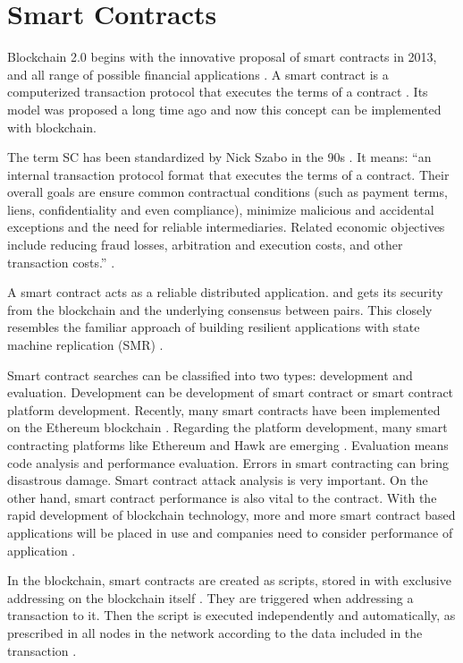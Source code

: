 \section{Smart Contracts}\label{sec:smartContracts}

Blockchain 2.0 begins with the innovative proposal of smart contracts in 2013, and all range of possible financial applications \cite{greve2018blockchain}. A smart contract is a computerized transaction protocol that executes the terms of a contract \cite{szabo1997idea}. Its model was proposed a long time ago and now this concept can be implemented with blockchain.

The term \acf{SC} has been standardized by Nick Szabo in the 90s \cite{greve2018blockchain}. It means: “an internal transaction protocol format that executes the terms of a contract. Their overall goals are ensure common contractual conditions (such as payment terms, liens, confidentiality and even compliance), minimize malicious and accidental exceptions and the need for reliable intermediaries. Related economic objectives include reducing fraud losses, arbitration and execution costs, and other transaction costs.” \cite{szabo1997idea}.

A smart contract acts as a reliable distributed application. and gets its security from the blockchain and the underlying consensus between pairs. This closely resembles the familiar approach of building resilient applications with state machine replication (SMR) \cite{schneider1990implementing}.

Smart contract searches can be classified into two types: development and evaluation. Development can be development of smart contract or smart contract platform development. Recently, many smart contracts have been implemented on the Ethereum blockchain \cite{wood2018secure}. Regarding the platform development, many smart contracting platforms like Ethereum \cite{wood2018secure} and Hawk \cite{kosbaa2016theblockchain} are emerging \cite{zheng2016blockchain}. Evaluation means code analysis and performance evaluation. Errors in smart contracting can bring disastrous damage. Smart contract attack analysis is very important. On the other hand, smart contract performance is also vital to the contract. With the rapid development of blockchain technology, more and more smart contract based applications will be placed in use and companies need to consider performance of application \cite{zheng2016blockchain}.

In the blockchain, smart contracts are created as scripts, stored in with exclusive addressing on the blockchain itself \cite{greve2018blockchain}. They are triggered when addressing a transaction to it. Then the script is executed independently and automatically, as prescribed in all nodes in the network according to the data included in the transaction \cite{christidis2016blockchains}.


